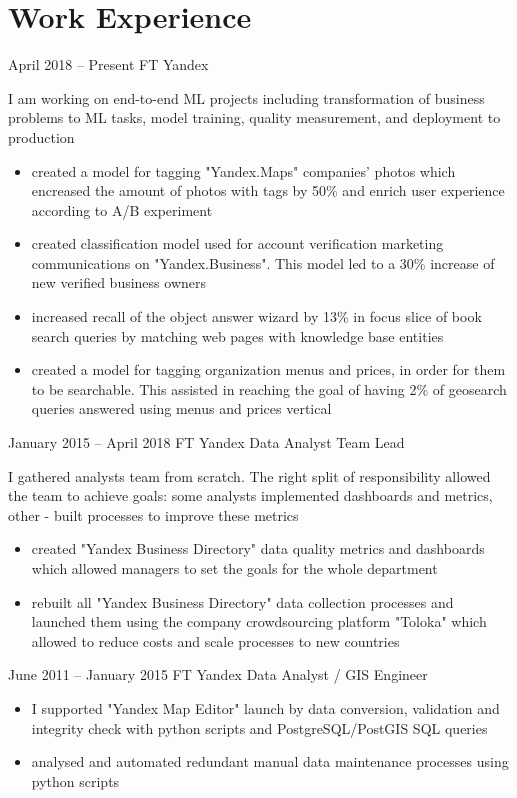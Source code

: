\section{Work Experience}

\jobentry
    {April 2018 -- Present}
    {FT}
    {Yandex}
    {\currentPosition}
    {
        I am working on end-to-end ML projects including transformation of business problems to ML tasks, model training, quality measurement, and deployment to production
        \begin{itemize}
            \item created a model for tagging "Yandex.Maps" companies' photos which encreased the amount of photos with tags by 50\% and enrich user experience according to A/B experiment
            \item created classification model used for account verification marketing communications on "Yandex.Business". This model led to a 30\% increase of new verified business owners
            \item increased recall of the object answer wizard by 13\% in focus slice of book search queries by matching web pages with knowledge base entities
            \item created a model for tagging organization menus and prices, in order for them to be searchable. This assisted in reaching the goal of having 2\% of geosearch queries answered using menus and prices vertical
        \end{itemize}
    }

\hrulefill

\jobentry
    {January 2015 -- April 2018}
    {FT}
    {Yandex}
    {Data Analyst Team Lead}
    {
        I gathered analysts team from scratch. The right split of responsibility allowed the team to achieve goals: some analysts implemented dashboards and metrics, other - built processes to improve these metrics
        \begin{itemize}
            \item created "Yandex Business Directory" data quality metrics and dashboards which allowed managers to set the goals for the whole department
            \item rebuilt all "Yandex Business Directory" data collection processes and launched them using the company crowdsourcing platform "Toloka" which allowed to reduce costs and scale processes to new countries
        \end{itemize}
    }

\hrulefill

\jobentry
    {June 2011 -- January 2015}
    {FT}
    {Yandex}
    {Data Analyst / GIS Engineer}
    {
        \begin{itemize}[topsep=0pt]
            \item I supported "Yandex Map Editor" launch by data conversion, validation and integrity check with python scripts and PostgreSQL/PostGIS SQL queries
            \item analysed and automated redundant manual data maintenance processes using python scripts
        \end{itemize}
    }
